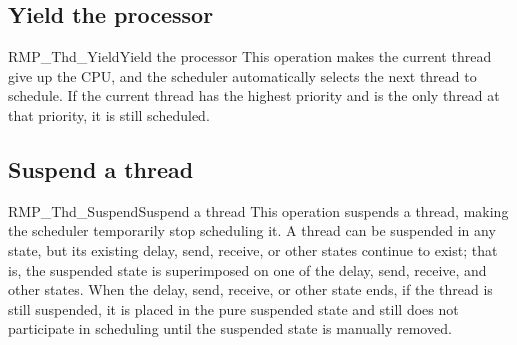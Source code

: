 \subsection{Yield the processor}
\begin{apidesc}{RMP\_Thd\_Yield}{Yield the processor}\label{api:RMP_Thd_Yield}
    This operation makes the current thread give up the CPU, and the scheduler automatically selects the next thread to schedule.
    If the current thread has the highest priority and is the only thread at that priority, it is still scheduled.
    \begin{apiparams}
    \end{apiparams}
    \begin{apiret}
    \end{apiret}
\end{apidesc}

\subsection{Suspend a thread}
\begin{apidesc}{RMP\_Thd\_Suspend}{Suspend a thread}\label{api:RMP_Thd_Suspend}
    This operation suspends a thread, making the scheduler temporarily stop scheduling it.
    A thread can be suspended in any state, but its existing delay, send, receive, or other states continue to exist; that is, the suspended state is superimposed on one of the delay, send, receive, and other states.
    When the delay, send, receive, or other state ends, if the thread is still suspended, it is placed in the pure suspended state and still does not participate in scheduling until the suspended state is manually removed.
    \begin{apiparams}
    \end{apiparams}
    \begin{apiret}
    \end{apiret}
\end{apidesc}


